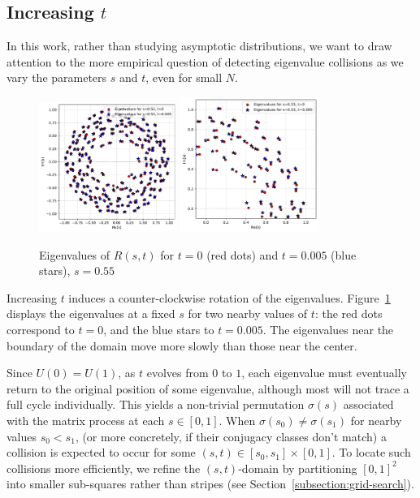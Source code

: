 \documentclass{article}
\begin{document}
	\subsection{Increasing $t$}

	In this work, rather than studying asymptotic distributions, 
	we want to draw attention to the more empirical question of detecting eigenvalue collisions 
	as we vary the parameters $s$ and $t$, even for small $N$.

	\begin{figure}[htbp]
		\centering
		\includegraphics[width=0.4\textwidth]{figures/intro_circle1.pdf}
		\includegraphics[width=0.4\textwidth]{figures/intro_circle2.pdf}
		   \caption{Eigenvalues of $R(s,t)$ for $t=0$ (red dots) and $t=0.005$ (blue stars), $s=0.55$}
		\label{fig:rotating_circle}
	\end{figure}

	Increasing $t$ induces a counter-clockwise rotation of the eigenvalues. 
	Figure~\ref{fig:rotating_circle} displays the eigenvalues at a fixed $s$ 
	for two nearby values of $t$: the red dots correspond to $t=0$, 
	and the blue stars to $t=0.005$. 
	The eigenvalues near the boundary of the domain move more slowly than those near the center.

	Since $U(0) = U(1)$, as $t$ evolves from $0$ to $1$, 
	each eigenvalue must eventually return to the original position of some eigenvalue, 
	although most will not trace a full cycle individually. 
	This yields a non-trivial permutation $\sigma(s)$ 
	associated with the matrix process at each $s \in [0,1]$.
	When $\sigma(s_0) \neq \sigma(s_1)$ for nearby values $s_0 < s_1$,
	(or more concretely, if their conjugacy classes don't match)  
	a collision is expected to occur for some $(s,t) \in [s_0,s_1] \times [0,1]$.
	To locate such collisions more efficiently, 
	we refine the $(s,t)$-domain by partitioning $[0,1]^2$ into smaller sub-squares 
	rather than stripes (see Section~\ref{subsection:grid-search}).
\end{document}
